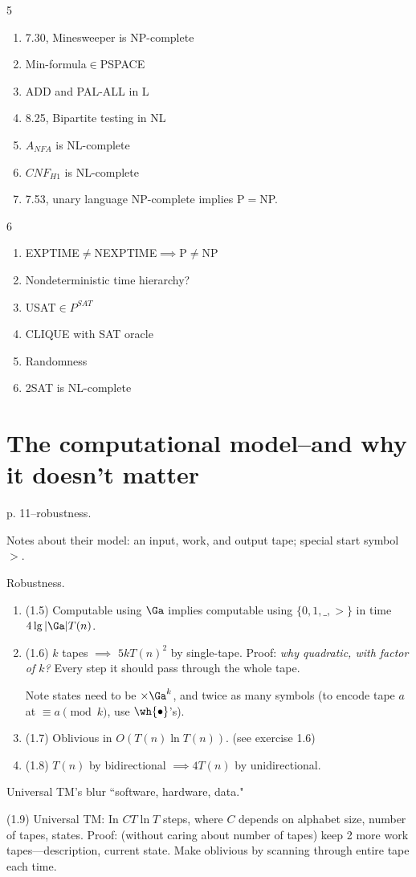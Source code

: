 5
\begin{enumerate}
\item 7.30, Minesweeper is NP-complete
\item Min-formula$\in$PSPACE
\item ADD and PAL-ALL in L
\item 8.25, Bipartite testing in NL
\item $A_{NFA}$ is NL-complete
\item $CNF_{H1}$ is NL-complete
\item 7.53, unary language NP-complete implies P$=$NP.
\end{enumerate}
6
\begin{enumerate}
\item EXPTIME$\ne$NEXPTIME$\implies$P$\ne$NP
\item Nondeterministic time hierarchy?
\item USAT$\in P^{SAT}$
\item CLIQUE with SAT oracle
\item Randomness
\item 2SAT is NL-complete
\end{enumerate}


\section{The computational model--and why it doesn't matter}
p. 11--robustness.

Notes about their model: an input, work, and output tape; special start symbol $>$.

Robustness.
\begin{enumerate}
\item
(1.5) Computable using $\Ga$ implies computable using $\{0,1,\_,>\}$ in time $4\lg |\Ga|T(n)$.
\item (1.6) $k$ tapes $\implies$ $5kT(n)^2$ by single-tape. Proof: 
{\it why quadratic, with factor of $k$?} Every step it should pass through the whole tape.

Note states need to be $\times \Ga^k$, and twice as many symbols (to encode tape $a$ at $\equiv a\pmod k$, use $\wh{\bullet}$'s).
\item
(1.7) Oblivious in $O(T(n)\ln T(n))$. (see exercise 1.6)
\item
(1.8) $T(n)$ by bidirectional $\implies 4T(n)$ by unidirectional.
\end{enumerate}
Universal TM's blur ``software, hardware, data."

(1.9) Universal TM: In $CT\ln T$ steps, where $C$ depends on alphabet size, number of tapes, states. Proof: (without caring about number of tapes) keep 2 more work tapes---description, current state. Make oblivious by scanning through entire tape each time. 

